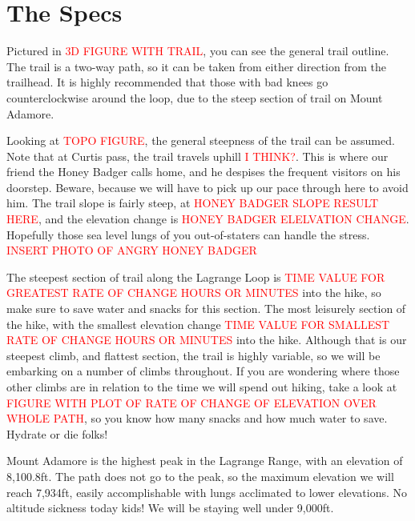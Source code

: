 \documentclass[12pt]{article}   %
\theoremstyle{definition}
\numberwithin{equation}{section}
\begin{document}
\section{The Specs}
\label{APPM2350proj01sec03}

\quad Pictured in \textcolor{red}{3D FIGURE WITH TRAIL}, you can see the general trail outline. The trail is a two-way path, so it can be taken from either direction from the trailhead. It is highly recommended that those with bad knees go counterclockwise around the loop, due to the steep section of trail on Mount Adamore.

\quad Looking at \textcolor{red}{TOPO FIGURE}, the general steepness of the trail can be assumed. Note that at Curtis pass, the trail travels uphill \textcolor{red}{I THINK?}. This is where our friend the Honey Badger calls home, and he despises the frequent visitors on his doorstep. Beware, because we will have to pick up our pace through here to avoid him. The trail slope is fairly steep, at \textcolor{red}{HONEY BADGER SLOPE RESULT HERE}, and the elevation change is \textcolor{red}{HONEY BADGER ELELVATION CHANGE}. Hopefully those sea level lungs of you out-of-staters can handle the stress.
\textcolor{red}{INSERT PHOTO OF ANGRY HONEY BADGER}

\quad The steepest section of trail along the Lagrange Loop is \textcolor{red}{TIME VALUE FOR GREATEST RATE OF CHANGE} \textcolor{red}{HOURS OR MINUTES} into the hike, so make sure to save water and snacks for this section. The most leisurely section of the hike, with the smallest elevation change \textcolor{red}{TIME VALUE FOR SMALLEST RATE OF CHANGE} \textcolor{red}{HOURS OR MINUTES} into the hike.
\quad Although that is our steepest climb, and flattest section, the trail is highly variable, so we will be embarking on a number of climbs throughout. If you are wondering where those other climbs are in relation to the time we will spend out hiking, take a look at \textcolor{red}{FIGURE WITH PLOT OF RATE OF CHANGE OF ELEVATION OVER WHOLE PATH}, so you know how many snacks and how much water to save. Hydrate or die folks!

\quad Mount Adamore is the highest peak in the Lagrange Range, with an elevation of 8,100.8ft. The path does not go to the peak, so the maximum elevation we will reach 7,934ft, easily accomplishable with lungs acclimated to lower elevations. No altitude sickness today kids! We will be staying well under 9,000ft.
\end{document}
